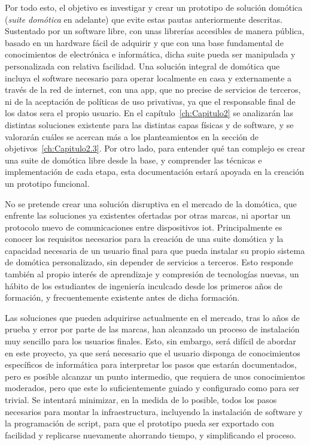 \vspace{1cm}

Por todo esto, el objetivo es investigar y crear un prototipo de solución domótica (\textit{suite domótica} en adelante) que evite estas pautas anteriormente descritas. Sustentado por un software libre, con unas librerías accesibles de manera pública, basado en un hardware fácil de adquirir y que con una base fundamental de conocimientos de electrónica e informática, dicha suite pueda ser manipulada y personalizada con relativa facilidad. Una solución integral de domótica que incluya el software necesario para operar localmente en casa y externamente a través de la red de internet, con una \gls{app}, que no precise de servicios de terceros, ni de la aceptación de políticas de uso privativas, ya que el responsable final de los datos sera el propio usuario. En el capítulo~\ref{ch:Capitulo2} se analizarán las distintas soluciones existente para las distintas capas físicas y de software, y se valorarán cuáles se acercan más a los planteamientos en la sección de objetivos~\ref{ch:Capitulo2.3}. Por otro lado, para entender qué tan complejo es crear una suite de domótica libre desde la base, y comprender las técnicas e implementación de cada etapa, esta documentación estará apoyada en la creación un prototipo funcional.

\vspace{1cm}

No se pretende crear una solución disruptiva en el mercado de la domótica, que enfrente las soluciones ya existentes ofertadas por otras marcas, ni aportar un protocolo nuevo de comunicaciones entre dispositivos \gls{iot}. Principalmente es conocer los requisitos necesarios para la creación de una suite domótica y la capacidad necesaria de un usuario final para que pueda instalar su propio sistema de domótica personalizado, sin depender de servicios a terceros. Esto responde también al propio interés de aprendizaje y compresión de tecnologías nuevas, un hábito de los estudiantes de ingeniería inculcado desde los primeros años de formación, y frecuentemente existente antes de dicha formación.

\vspace{1cm}

Las soluciones que pueden adquirirse actualmente en el mercado, tras lo años de prueba y error por parte de las marcas, han alcanzado un proceso de instalación muy sencillo para los usuarios finales. Esto, sin embargo, será difícil de abordar en este proyecto, ya que será necesario que el usuario disponga de conocimientos específicos de informática para interpretar los pasos que estarán documentados, pero es posible alcanzar un punto intermedio, que requiera de unos conocimientos moderados, pero que este lo suficientemente guiado y configurado como para ser trivial. Se intentará minimizar, en la medida de lo posible, todos los pasos necesarios para montar la infraestructura, incluyendo la instalación de software y la programación de \gls{script}, para que el prototipo pueda ser exportado con facilidad y replicarse nuevamente ahorrando tiempo, y simplificando el proceso.


